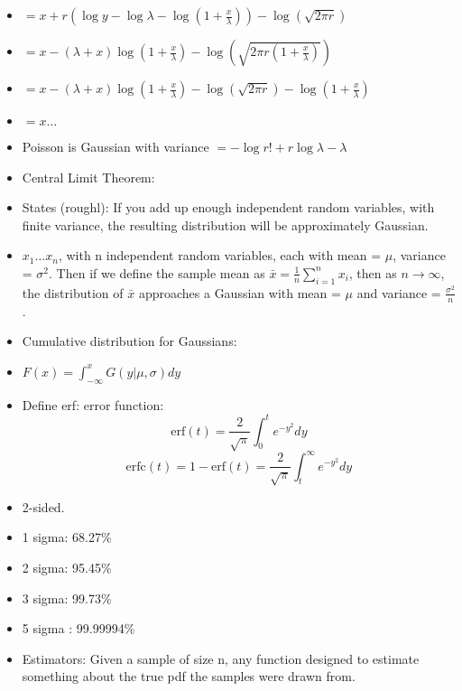 \begin{itemize}
    \item $= x+r(\log y - \log \lambda - \log(1 + \frac{x}{\lambda})) - \log(\sqrt{2 \pi r})$
    \item $=x- (\lambda + x) \log(1 + \frac{x}{\lambda}) - \log(\sqrt{2 \pi r (1+ \frac{x}{\lambda})})$
    \item $=x- (\lambda + x) \log(1 + \frac{x}{\lambda}) - \log(\sqrt{2 \pi r }) - \log(1+\frac{x}{\lambda})$
    \item $=x \ldots $
    \item Poisson is Gaussian with variance $ = - \log r! + r \log \lambda - \lambda$
    \item Central Limit Theorem:
    \item States (roughl): If you add up enough independent random variables, with finite variance, the resulting distribution will be approximately Gaussian.
    \item $x_1 \ldots x_n$, with n independent random variables, each with mean = $\mu$, variance = $\sigma^2$. Then if we define the sample mean as $ \bar{x} = \frac{1}{n} \sum_{i=1}^{n} x_i$, then as $n \rightarrow \infty$, the distribution of $\bar{x}$ approaches a Gaussian with mean = $\mu$ and variance = $\frac{\sigma^2}{n}$.
    \item Cumulative distribution for Gaussians:
    \item $F(x) = \int_{-\infty}^{x} G(y|\mu, \sigma) dy$
    \item Define erf: error function:
          \[ \text{erf}(t) = \frac{2}{\sqrt{\pi}} \int_{0}^{t} e^{-y^2} dy \]
          \[ \text{erfc}(t) = 1 - \text{erf}(t) = \frac{2}{\sqrt{\pi}} \int_{t}^{\infty} e^{-y^2} dy \]
    \item 2-sided.
    \item 1 sigma: 68.27\%
    \item 2 sigma: 95.45\%
    \item 3 sigma: 99.73\%
    \item 5 sigma : 99.99994\%
    \item Estimators: Given a sample of size n, any function designed to estimate something about the true pdf the samples were drawn from.
\end{itemize}